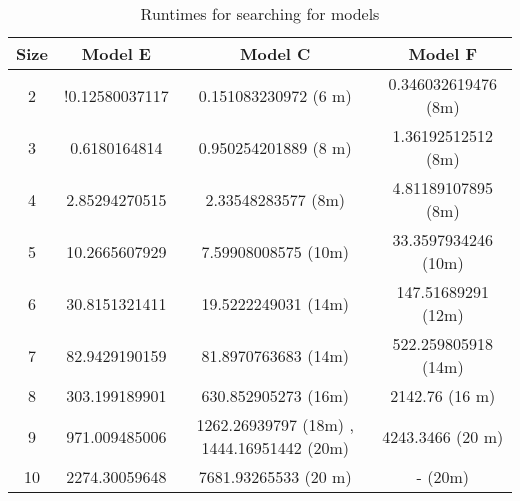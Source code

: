 \begin{table}[t]
  \centering
  \begin{tabular}[t]{|c|c|c|c|}\hline
    \textbf{Size} &  \textbf{Model E}   & \textbf{ Model C} &  \textbf{Model F} \\\hline
   
    2 & !0.12580037117 & 0.151083230972 (6 m) & 0.346032619476 (8m)\\\hline
    3 & 0.6180164814 & 0.950254201889 (8 m) & 1.36192512512 (8m)\\\hline
    4 & 2.85294270515 & 2.33548283577 (8m)& 4.81189107895 (8m)\\\hline
    5 & 10.2665607929 & 7.59908008575 (10m)& 33.3597934246 (10m) \\\hline
    6 & 30.8151321411 & 19.5222249031 (14m)& 147.51689291 (12m)\\\hline
    7 & 82.9429190159& 81.8970763683 (14m)& 522.259805918 (14m)\\\hline
    8 & 303.199189901 &  630.852905273 (16m)&  2142.76 (16 m)\\\hline
    9 & 971.009485006& 1262.26939797 (18m) , 1444.16951442 (20m)
& 4243.3466 (20 m)\\\hline
    10 & 2274.30059648 &  7681.93265533 (20 m) &  - (20m)\\\hline
  \end{tabular}
  \caption{Runtimes for searching for models}
  \label{tab:qf-grabh}
\end{table}


